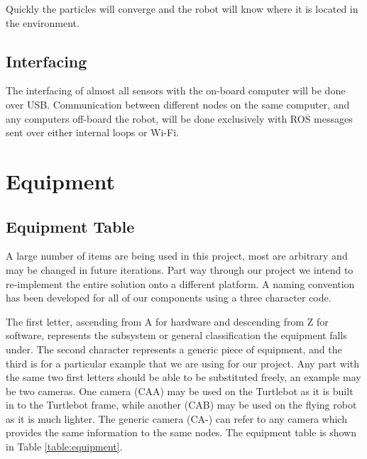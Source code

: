 \documentclass{article}[12]
\begin{document}
		Quickly the particles will converge and the robot will know where it is located in the environment.

	\subsection{Interfacing}
	
	The interfacing of almost all sensors with the on-board computer will be done over USB. Communication between different nodes on the same computer, and any computers off-board the robot, will be done exclusively with ROS messages sent over either internal loops or Wi-Fi.

\section{Equipment}

	\subsection{Equipment Table}
	
	A large number of items are being used in this project, most are arbitrary and may be changed in future iterations. Part way through our project we intend to re-implement the entire solution onto a different platform. A naming convention has been developed for all of our components using a three character code.
	
	The first letter, ascending from A for hardware and descending from Z for software, represents the subsystem or general classification the equipment falls under. The second character represents a generic piece of equipment, and the third is for a particular example that we are using for our project. Any part with the same two first letters should be able to be substituted freely, an example may be two cameras. One camera (CAA) may be used on the Turtlebot as it is built in to the Turtlebot frame, while another (CAB) may be used on the flying robot as it is much lighter. The generic camera (CA-) can refer to any camera which provides the same information to the same nodes. The equipment table is shown in Table \ref{table:equipment}.
	
\end{document}
